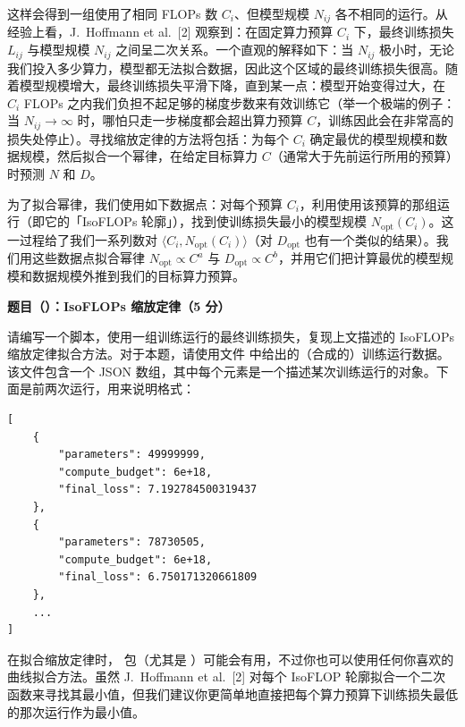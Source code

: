 这样会得到一组使用了相同 FLOPs 数 $C_i$、但模型规模 $N_{ij}$ 各不相同的运行。从经验上看，J.~Hoffmann et al.~[2] 观察到：在固定算力预算 $C_i$ 下，最终训练损失 $L_{ij}$ 与模型规模 $N_{ij}$ 之间呈二次关系。一个直观的解释如下：当 $N_{ij}$ 极小时，无论我们投入多少算力，模型都无法拟合数据，因此这个区域的最终训练损失很高。随着模型规模增大，最终训练损失平滑下降，直到某一点：模型开始变得过大，在 $C_i$ FLOPs 之内我们负担不起足够的梯度步数来有效训练它（举一个极端的例子：当 $N_{ij} \to \infty$ 时，哪怕只走一步梯度都会超出算力预算 $C$，训练因此会在非常高的损失处停止）。寻找缩放定律的方法将包括：为每个 $C_i$ 确定最优的模型规模和数据规模，然后拟合一个幂律，在给定目标算力 $C$（通常大于先前运行所用的预算）时预测 $N$ 和 $D$。

为了拟合幂律，我们使用如下数据点：对每个预算 $C_i$，利用使用该预算的那组运行（即它的「IsoFLOPs 轮廓」），找到使训练损失最小的模型规模 $N_{\mathrm{opt}}(C_i)$。这一过程给了我们一系列数对 $\langle C_i, N_{\mathrm{opt}}(C_i) \rangle$（对 $D_{\mathrm{opt}}$ 也有一个类似的结果）。我们用这些数据点拟合幂律 $N_{\mathrm{opt}} \propto C^a$ 与 $D_{\mathrm{opt}} \propto C^b$，并用它们把计算最优的模型规模和数据规模外推到我们的目标算力预算。

\noindent\textbf{题目（）：IsoFLOPs 缩放定律（5 分）}

请编写一个脚本，使用一组训练运行的最终训练损失，复现上文描述的 IsoFLOPs 缩放定律拟合方法。对于本题，请使用文件  中给出的（合成的）训练运行数据。该文件包含一个 JSON 数组，其中每个元素是一个描述某次训练运行的对象。下面是前两次运行，用来说明格式：

\begin{lstlisting}
[
    {
        "parameters": 49999999,
        "compute_budget": 6e+18,
        "final_loss": 7.192784500319437
    },
    {
        "parameters": 78730505,
        "compute_budget": 6e+18,
        "final_loss": 6.750171320661809
    },
    ...
]
\end{lstlisting}

在拟合缩放定律时， 包（尤其是 ）可能会有用，不过你也可以使用任何你喜欢的曲线拟合方法。虽然 J.~Hoffmann et al.~[2] 对每个 IsoFLOP 轮廓拟合一个二次函数来寻找其最小值，但我们建议你更简单地直接把每个算力预算下训练损失最低的那次运行作为最小值。


